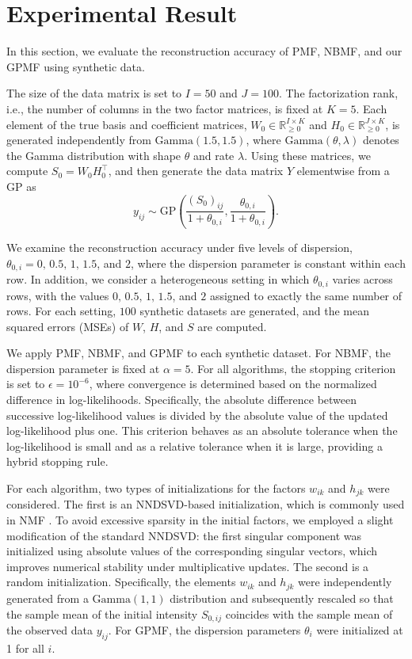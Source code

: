 \documentclass[pdflatex,sn-basic]{sn-jnl}%
\theoremstyle{thmstyleone}%
\theoremstyle{thmstyletwo}%
\theoremstyle{thmstylethree}%
\begin{document}
\section{Experimental Result}\label{Sec: Experimental Result}
In this section, we evaluate the reconstruction accuracy of PMF, NBMF, and our GPMF using synthetic data. 

The size of the data matrix is set to $I=50$ and $J=100$. The factorization rank, i.e., the number of columns in the two factor matrices, is fixed at $K=5$. Each element of the true basis and coefficient matrices, $W_{0}\in\mathbb{R}_{\ge0}^{I\times K}$ and $H_{0}\in\mathbb{R}_{\ge0}^{J\times K}$, is generated independently from $\mathrm{Gamma}(1.5,1.5)$, where $\mathrm{Gamma}(\theta,\lambda)$ denotes the Gamma distribution with shape $\theta$ and rate $\lambda$. Using these matrices, we compute $S_{0}=W_{0}H_{0}^{\top}$, and then generate the data matrix $Y$ elementwise from a GP as
\[
y_{ij}\sim\mathrm{GP}\left(\dfrac{(S_0)_{ij}}{1+\theta_{0,i}},\dfrac{\theta_{0,i}}{1+\theta_{0,i}}\right).
\]

We examine the reconstruction accuracy under five levels of dispersion, $\theta_{0,i}=0,\,0.5,\,1,\,1.5$, and $2$, where the dispersion parameter is constant within each row. In addition, we consider a heterogeneous setting in which $\theta_{0,i}$ varies across rows, with the values $0,\,0.5,\,1,\,1.5$, and $2$ assigned to exactly the same number of rows. For each setting, $100$ synthetic datasets are generated, and the mean squared errors (MSEs) of $W$, $H$, and $S$ are computed.  

We apply PMF, NBMF, and GPMF to each synthetic dataset. For NBMF, the dispersion parameter is fixed at $\alpha=5$. For all algorithms, the stopping criterion is set to $\epsilon = 10^{-6}$, where convergence is determined based on the normalized difference in log-likelihoods. Specifically, the absolute difference between successive log-likelihood values is divided by the absolute value of the updated log-likelihood plus one. This criterion behaves as an absolute tolerance when the log-likelihood is small and as a relative tolerance when it is large, providing a hybrid stopping rule.

For each algorithm, two types of initializations for the factors $w_{ik}$ and $h_{jk}$ were considered. The first is an NNDSVD-based initialization, which is commonly used in NMF \citep{boutsidis2008nndsvd}. To avoid excessive sparsity in the initial factors, we employed a slight modification of the standard NNDSVD: the first singular component was initialized using absolute values of the corresponding singular vectors, which improves numerical stability under multiplicative updates. The second is a random initialization. Specifically, the elements $w_{ik}$ and $h_{jk}$ were independently generated from a $\mathrm{Gamma}(1,1)$ distribution and subsequently rescaled so that the sample mean of the initial intensity $S_{0,ij}$ coincides with the sample mean of the observed data $y_{ij}$. For GPMF, the dispersion parameters $\theta_i$ were initialized at 1 for all $i$.
\end{document}
